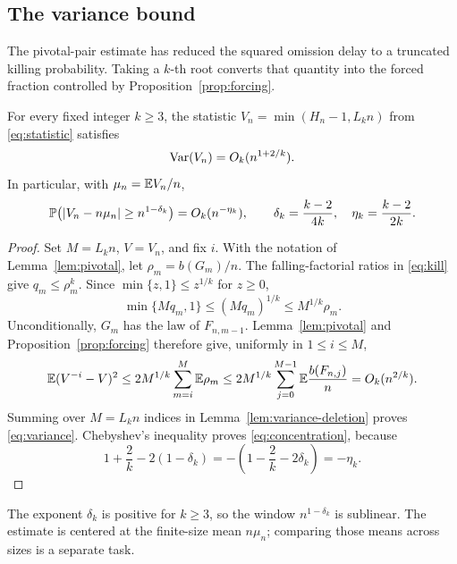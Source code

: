 \subsection{The variance bound}

The pivotal-pair estimate has reduced the squared omission delay to a
truncated killing probability. Taking a \(k\)-th root converts that
quantity into the forced fraction controlled by
Proposition~\ref{prop:forcing}.

\begin{proposition}\label{prop:concentration}
For every fixed integer \(k\ge3\), the statistic
\(V_n=\min(H_n-1,L_kn)\) from \eqref{eq:statistic} satisfies
\begin{equation}\label{eq:variance}
 \operatorname{Var}(V_n)=O_k(n^{1+2/k}).
\end{equation}
In particular, with \(\mu_n=\mathbb E V_n/n\),
\begin{equation}\label{eq:concentration}
 \mathbb P\bigl(|V_n-n\mu_n|\ge n^{1-\delta_k}\bigr)
 =O_k(n^{-\eta_k}),\qquad
 \delta_k=\frac{k-2}{4k},\quad \eta_k=\frac{k-2}{2k}.
\end{equation}
\end{proposition}

\begin{proof}
Set \(M=L_kn\), \(V=V_n\), and fix \(i\). With the notation of
Lemma~\ref{lem:pivotal}, let \(\rho_m=b(G_m)/n\).
The falling-factorial ratios in \eqref{eq:kill} give
\(q_m\le\rho_m^k\). Since \(\min\{z,1\}\le z^{1/k}\) for \(z\ge0\),
\[
 \min\{Mq_m,1\}\le(Mq_m)^{1/k}\le M^{1/k}\rho_m.
\]
Unconditionally, \(G_m\) has the law of \(F_{n,m-1}\).
Lemma~\ref{lem:pivotal} and Proposition~\ref{prop:forcing} therefore
give, uniformly in \(1\le i\le M\),
\[
 \mathbb E(V^{-i}-V)^2
 \le2M^{1/k}\sum_{m=i}^{M}\mathbb E\rho_m
 \le2M^{1/k}\sum_{j=0}^{M-1}\mathbb E\frac{b(F_{n,j})}{n}
 =O_k(n^{2/k}).
\]
Summing over \(M=L_kn\) indices in
Lemma~\ref{lem:variance-deletion} proves \eqref{eq:variance}.
Chebyshev's inequality proves \eqref{eq:concentration}, because
\[
 1+\frac2k-2(1-\delta_k)
 =-\left(1-\frac2k-2\delta_k\right)=-\eta_k.
\]
\end{proof}

The exponent \(\delta_k\) is positive for \(k\ge3\), so the window
\(n^{1-\delta_k}\) is sublinear. The estimate is centered at the
finite-size mean \(n\mu_n\); comparing those means across sizes is a
separate task.
